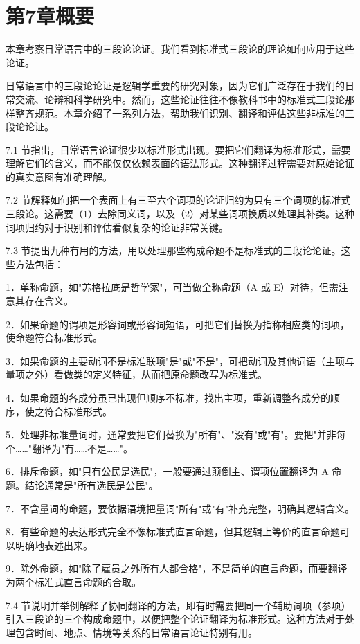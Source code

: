 \section{第7章概要}
本章考察日常语言中的三段论论证。我们看到标准式三段论的理论如何应用于这些论证。

日常语言中的三段论论证是逻辑学重要的研究对象，因为它们广泛存在于我们的日常交流、论辩和科学研究中。然而，这些论证往往不像教科书中的标准式三段论那样整齐规范。本章介绍了一系列方法，帮助我们识别、翻译和评估这些非标准的三段论论证。

7.1 节指出，日常语言论证很少以标准形式出现。要把它们翻译为标准形式，需要理解它们的含义，而不能仅仅依赖表面的语法形式。这种翻译过程需要对原始论证的真实意图有准确理解。

7.2 节解释如何把一个表面上有三至六个词项的论证归约为只有三个词项的标准式三段论。这需要（1）去除同义词，以及（2）对某些词项换质以处理其补类。这种词项归约对于识别和评估看似复杂的论证非常关键。

7.3 节提出九种有用的方法，用以处理那些构成命题不是标准式的三段论论证。这些方法包括：

1．单称命题，如"苏格拉底是哲学家"，可当做全称命题（A 或 E）对待，但需注意其存在含义。

2．如果命题的谓项是形容词或形容词短语，可把它们替换为指称相应类的词项，使命题符合标准形式。

3．如果命题的主要动词不是标准联项"是"或"不是"，可把动词及其他词语（主项与量项之外）看做类的定义特征，从而把原命题改写为标准式。

4．如果命题的各成分虽已出现但顺序不标准，找出主项，重新调整各成分的顺序，使之符合标准形式。

5．处理非标准量词时，通常要把它们替换为"所有"、"没有"或"有"。要把"并非每个……"翻译为"有……不是……"。

6．排斥命题，如"只有公民是选民"，一般要通过颠倒主、谓项位置翻译为 A 命题。结论通常是"所有选民是公民"。

7．不含量词的命题，要依据语境把量词"所有"或"有"补充完整，明确其逻辑含义。

8．有些命题的表达形式完全不像标准式直言命题，但其逻辑上等价的直言命题可以明确地表述出来。

9．除外命题，如"除了雇员之外所有人都合格"，不是简单的直言命题，而要翻译为两个标准式直言命题的合取。

7.4 节说明并举例解释了协同翻译的方法，即有时需要把同一个辅助词项（参项）引入三段论的三个构成命题中，以便把整个论证翻译为标准形式。这种方法对于处理包含时间、地点、情境等关系的日常语言论证特别有用。

